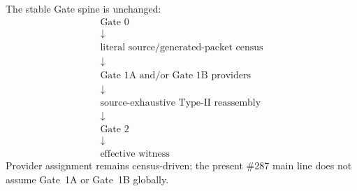 \documentclass[11pt]{article}
\theoremstyle{definition}
\newcommand{\1}{\mathbf 1}
\begin{document}
The stable Gate spine is unchanged:
\[
\boxed{
\begin{array}{c}
\text{Gate 0}\\
\downarrow\\
\text{literal source/generated-packet census}\\
\downarrow\\
\text{Gate 1A and/or Gate 1B providers}\\
\downarrow\\
\text{source-exhaustive Type-II reassembly}\\
\downarrow\\
\text{Gate 2}\\
\downarrow\\
\text{effective witness}
\end{array}}
\]
Provider assignment remains census-driven; the present \#287 main line does not assume
Gate~1A or Gate~1B globally.
\end{document}
